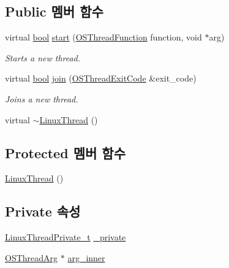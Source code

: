 \subsection*{Public 멤버 함수}
\begin{DoxyCompactItemize}
\item 
virtual \hyperlink{avb__gptp_8h_af6a258d8f3ee5206d682d799316314b1}{bool} \hyperlink{class_linux_thread_a8a40b1f7308f392fe8b937260b561e31}{start} (\hyperlink{avbts__osthread_8hpp_a68966f4aba46c269e8341073e7787d34}{O\+S\+Thread\+Function} function, void $\ast$arg)
\begin{DoxyCompactList}\small\item\em Starts a new thread. \end{DoxyCompactList}\item 
virtual \hyperlink{avb__gptp_8h_af6a258d8f3ee5206d682d799316314b1}{bool} \hyperlink{class_linux_thread_a33e1de8f5b8da16daea1d4d8a2313449}{join} (\hyperlink{avbts__osthread_8hpp_a82108124541f8ae837064a49057d2f82}{O\+S\+Thread\+Exit\+Code} \&exit\+\_\+code)
\begin{DoxyCompactList}\small\item\em Joins a new thread. \end{DoxyCompactList}\item 
virtual \hyperlink{class_linux_thread_a100738c60625459a0b7e28a1ae872751}{$\sim$\+Linux\+Thread} ()
\end{DoxyCompactItemize}
\subsection*{Protected 멤버 함수}
\begin{DoxyCompactItemize}
\item 
\hyperlink{class_linux_thread_aa7475d6cdfc5e834d16d9bf8a2bd6689}{Linux\+Thread} ()
\end{DoxyCompactItemize}
\subsection*{Private 속성}
\begin{DoxyCompactItemize}
\item 
\hyperlink{linux__hal__common_8hpp_a59fd78b335c5218a7ad2d27befbb72ee}{Linux\+Thread\+Private\+\_\+t} \hyperlink{class_linux_thread_ad25964f3bb9f697a3c24ce8805e7806a}{\+\_\+private}
\item 
\hyperlink{struct_o_s_thread_arg}{O\+S\+Thread\+Arg} $\ast$ \hyperlink{class_linux_thread_af6992b2f52fbe4a2362f1f0a81371185}{arg\+\_\+inner}
\end{DoxyCompactItemize}
